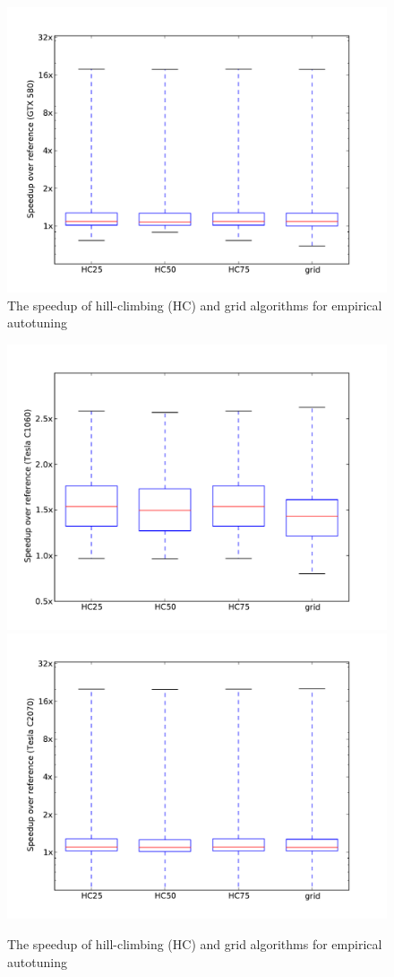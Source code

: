 \documentclass{sig-alternate}
\begin{document}
\begin{figure}
\centering
\includegraphics[scale=.42]{fig_genX_munctional0_580.pdf}
\caption{The speedup of hill-climbing (HC) and grid algorithms for empirical autotuning}
\label{fig:speedup}
\end{figure}

\begin{figure}
\centering
\includegraphics[scale=.42]{fig_genX_munctional0_1060.pdf}
\includegraphics[scale=.42]{fig_genX_munctional0_2070.pdf}
\caption{The speedup of hill-climbing (HC) and grid algorithms for empirical autotuning}
\label{fig:speedup}
\end{figure}


\end{document}
